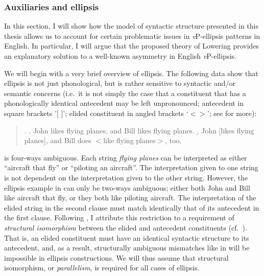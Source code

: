 \subsubsection{Auxiliaries and ellipsis}\label{aux_ellipsis_sec}
In this section, I will show how the model of syntactic structure presented in this thesis allows us to account for certain problematic issues in {\it v}P-ellipsis patterns in English. In particular, I will argue that the proposed theory of Lowering provides an explanatory solution to a well-known asymmetry in English {\it v}P-ellipsis.

We will begin with a very brief overview of ellipsis. The following data show that ellipsis is not just phonological, but is rather sensitive to syntactic and/or semantic concerns (i.e.\ it is not simply the case that a constituent that has a phonologically identical antecedent may be left unpronounced; antecedent in square brackets '[ ]'; elided constituent in angled brackets `$< >$'; see  for more):

\singlespacing
\begin{quote}
\begin{minipage}{5in}
\ex.
\a. John likes flying planes, and Bill likes flying planes.
\b. John [likes flying planes], and Bill does $<$like flying planes$>$, too.

\end{minipage}
\end{quote}
\onehalfspacing
\Last[a] is four-ways ambiguous. Each string {\it flying planes} can be interpreted as either ``aircraft that fly'' or ``piloting an aircraft''. The interpretation given to one string is not dependent on the interpretation given to the other string. However, the ellipsis example in \Last[b] can only be two-ways ambiguous; either both John and Bill like aircraft that fly, or they both like piloting aircraft. The interpretation of the elided string in the second clause must match identically that of its antecedent in the first clause. Following \citet{rooth1992}, I attribute this restriction to a requirement of {\it structural isomorphism} between the elided and antecedent constituents (cf.\ ). That is, an elided constituent must have an identical syntactic structure to its antecedent, and, as a result, structurally ambiguous mismatches like in \Last[a] will be impossible in ellipsis constructions. We will thus assume that structural isomorphism, or {\it parallelism}, is required for all cases of ellipsis.


